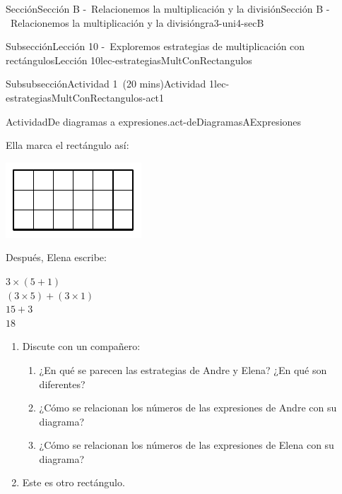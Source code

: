 \documentclass[oneside,10pt,]{article}
\begin{document}
\begin{sectionptx}{Sección}{Sección B -~Relacionemos la multiplicación y la división}{}{Sección B -~Relacionemos la multiplicación y la división}{}{}{gra3-uni4-secB}
\begin{subsectionptx}{Subsección}{Lección 10 -~Exploremos estrategias de multiplicación con rectángulos}{}{Lección 10}{}{}{lec-estrategiasMultConRectangulos}
\begin{subsubsectionptx}{Subsubsección}{Actividad 1~(20 mins)}{}{Actividad 1}{}{}{lec-estrategiasMultConRectangulos-act1}
\begin{activity}{Actividad}{De diagramas a expresiones.}{act-deDiagramasAExpresiones}
\begin{sidebyside}{3}{0}{0}{0.065}
\begin{sbspanel}{0.27}
\end{sbspanel}%
\begin{sbspanel}{0.35}%
Ella marca el rectángulo así:%
\par
\includegraphics[width=\linewidth]{external/svg-source/tikz-file-153045.pdf}
\end{sbspanel}%
\begin{sbspanel}{0.25}%
Después, Elena escribe:%
\par
\(3 \times (5 + 1)\)\\
 \((3 \times 5) + (3 \times 1)\)\\
 \(15+3\)\\
 \(18\)%
\end{sbspanel}%
\end{sidebyside}%
%
\begin{enumerate}
\item{}Discute con un compañero:%
%
\begin{enumerate}
\item{}¿En qué se parecen las estrategias de Andre y Elena? ¿En qué son diferentes?%
\item{}¿Cómo se relacionan los números de las expresiones de Andre con su diagrama?%
\item{}¿Cómo se relacionan los números de las expresiones de Elena con su diagrama?%
\end{enumerate}
\item{}Este es otro rectángulo.%
\begin{image}{0}{1}{0}{}%

\end{image}
\end{enumerate}
\end{activity}
\end{subsubsectionptx}
\end{subsectionptx}
\end{sectionptx}
\end{document}
